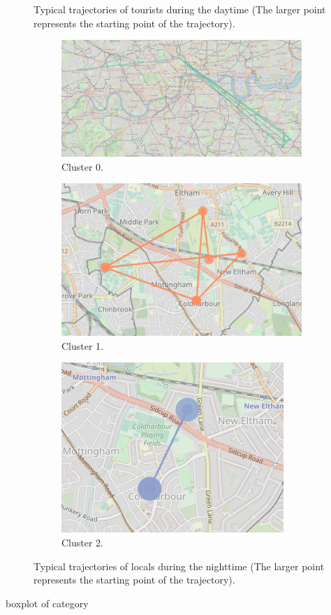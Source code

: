 \documentclass{article}
\theoremstyle{definition}
\theoremstyle{remark}
\begin{document}
\begin{figure}[!h]
\caption{Typical trajectories of tourists during the daytime (The larger point represents the starting point of the trajectory).}
\label{fig:sequences_daytime_tourists}
\end{figure}


\begin{figure}[!h]

\centering
\begin{subfigure}{0.6\textheight}
\centering
\includegraphics[width=0.4\linewidth]{figures/nighttime_locals_c0.png}
\caption{Cluster 0.}
\label{fig:nighttime_locals_c0}
\end{subfigure}
\begin{subfigure}{0.6\textheight}
\centering
\includegraphics[width=0.4\linewidth]{figures/nighttime_locals_c1.png}
\caption{Cluster 1.}
\label{fig:nighttime_locals_c1}
\end{subfigure}
\begin{subfigure}{0.6\textheight}
\centering
\includegraphics[width=0.4\linewidth]{figures/nighttime_locals_c2.png}
\caption{Cluster 2.}
\label{fig:nighttime_locals_c2}
\end{subfigure}

\caption{Typical trajectories of locals during the nighttime (The larger point represents the starting point of the trajectory).}
\label{fig:sequences_daytime_locals}
\end{figure}

boxplot of category
\end{document}
